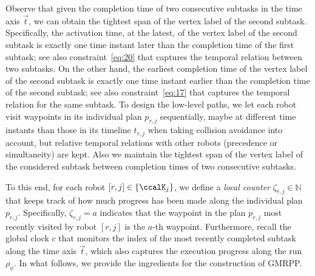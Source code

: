 \documentclass[Afour,sageh,times]{sagej}
\newcommand{\auto}[1]{\ccalA_{\textup{#1}}}
\newcommand{\autop}{\ccalA_{\phi}}
\newcommand{\domanda}[1]{\subsubsection*{#1}}
\begin{document}
{{ {Observe that given the completion time of two consecutive subtasks in the time axis $\vec{t}$, we can obtain the tightest span of the vertex label of the second subtask. Specifically, the activation time, at the latest, of the vertex label of the second subtask is exactly one time instant later than the completion time of the first subtask; see also constraint~\eqref{eq:20} that captures the temporal relation between two subtasks. On the other hand, the earliest completion time of the vertex label of the second subtask is exactly one time instant earlier than the completion time of the second subtask; see also constraint~\eqref{eq:17} that captures the temporal relation for the same subtask.  To design the low-level paths,  we let each robot visit waypoints in its individual plan $p_{r,j}$ sequentially, maybe at different time instants than those in its timeline $t_{r,j}$ when taking collision avoidance into account, but relative temporal relations with other robots (precedence or simultaneity) are kept. Also we maintain the tightest span of the vertex label of the considered subtask between completion times of two consecutive subtasks.}

 To this end, for each robot $[r,j] \in \{\ccalK_j\}$, we define a {\it local counter} $\zeta_{r,j} \in \mathbb{N}$  that  keeps track of how much progress has been made along the individual plan $p_{r,j}$. Specifically, $\zeta_{r,j} = a$ indicates that the waypoint in the plan $p_{r,j}$ most recently visited by  robot $[r,j]$ is the $a$-th waypoint. Furthermore, recall the  global clock $c$ that monitors the index of the most recently completed subtask  along the time axis $\vec{t}$, which also captures the execution progress along the run $\rho_\phi$. In what follows, we provide the ingredients for the construction of GMRPP.


}}
\end{document}
